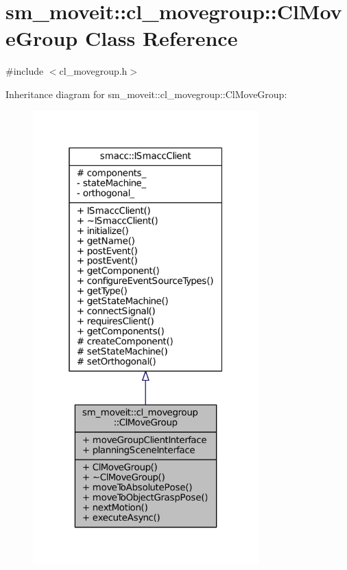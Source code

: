 \hypertarget{classsm__moveit_1_1cl__movegroup_1_1ClMoveGroup}{}\section{sm\+\_\+moveit\+:\+:cl\+\_\+movegroup\+:\+:Cl\+Move\+Group Class Reference}
\label{classsm__moveit_1_1cl__movegroup_1_1ClMoveGroup}


{\ttfamily \#include $<$cl\+\_\+movegroup.\+h$>$}



Inheritance diagram for sm\+\_\+moveit\+:\+:cl\+\_\+movegroup\+:\+:Cl\+Move\+Group\+:
\nopagebreak
\begin{figure}[H]
\begin{center}
\leavevmode
\includegraphics[width=247pt]{classsm__moveit_1_1cl__movegroup_1_1ClMoveGroup__inherit__graph}
\end{center}
\end{figure}


